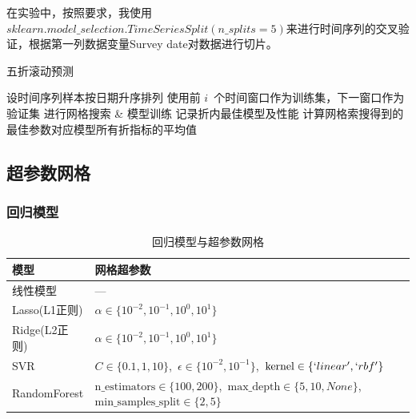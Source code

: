 \documentclass[10pt]{article}
\begin{document}
在实验中，按照要求，我使用$sklearn.model\_selection.TimeSeriesSplit(n\_splits = 5)$来进行时间序列的交叉验证，根据第一列数据变量Survey date对数据进行切片。
\begin{algorithm}[H]
  \caption{五折滚动预测}
  \begin{algorithmic}[1]
    \State 设时间序列样本按日期升序排列
      \State 使用前 $i$ 个时间窗口作为训练集，下一窗口作为验证集
      \State 进行网格搜索 \& 模型训练
      \State 记录折内最佳模型及性能
    \EndFor
    \State 计算网格索搜得到的最佳参数对应模型所有折指标的平均值
  \end{algorithmic}
\end{algorithm}

\subsection{超参数网格}
\subsubsection{回归模型}
\begin{table}[H]\centering
  \caption{回归模型与超参数网格}
  \begin{tabular}{ll}
    \toprule
    模型 & 网格超参数 \\ \midrule
    线性模型 & — \\
    Lasso(L1正则) & $\alpha \in \{10^{-2},10^{-1},10^{0},10^{1}\}$ \\
    Ridge(L2正则) & $\alpha \in \{10^{-2},10^{-1},10^{0},10^{1}\}$ \\
    SVR & $C\in\{0.1,1,10\}$,\  $\epsilon\in\{10^{-2},10^{-1}\}$,\ $\text{kernel}\in\{`linear',`rbf'\}$ \\
    RandomForest & $\text{n\_estimators}\in\{100,200\}$,\  $\text{max\_depth}\in\{5,10,None\}$,\  $\text{min\_samples\_split}\in\{2,5\}$ \\
    \bottomrule
  \end{tabular}
\end{table}
\end{document}
